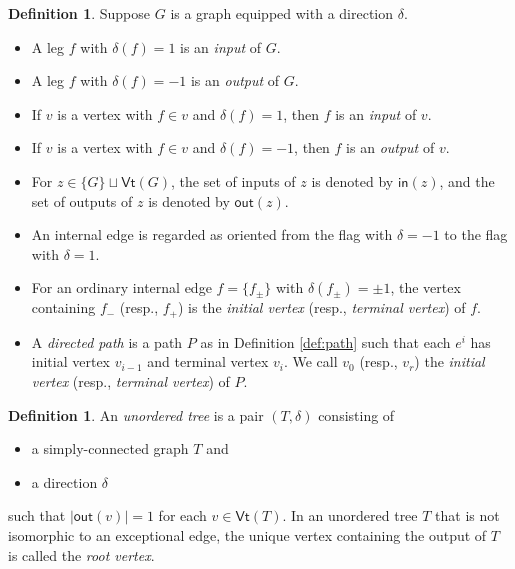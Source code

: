 \documentclass{amsbook}
\numberwithin{section}{chapter}
\numberwithin{subsection}{section}
\numberwithin{equation}{section}
\theoremstyle{plain}
\theoremstyle{definition}
\newtheorem{definition}[equation]{Definition}
\newcommand{\Vt}{\mathsf{Vt}}
\newcommand{\inp}{\mathsf{in}}
\newcommand{\out}{\mathsf{out}}
\begin{document}
\begin{definition}\label{def:directed-path} 
Suppose $G$ is a graph equipped with a direction $\delta$.
\begin{itemize} \item A leg $f$ with $\delta(f) = 1$ is an \emph{input} of $G$.
\item A leg $f$ with $\delta(f) = -1$ is an  \emph{output} of $G$.
\item If $v$ is a vertex with $f \in v$ and $\delta(f) = 1$, then $f$ is an \emph{input} of $v$.
\item If $v$ is a vertex with $f \in v$ and $\delta(f) = -1$, then $f$ is an \emph{output} of $v$.
\item For $z \in \{G\} \sqcup \Vt(G)$, the set of inputs of $z$ is denoted by $\inp(z)$, and the set of outputs of $z$ is denoted by $\out(z)$.
\item An internal edge is regarded as oriented from the flag with $\delta=-1$ to the flag with $\delta=1$.
\item For an ordinary internal edge $f=\{f_{\pm}\}$ with $\delta(f_{\pm})=\pm 1$, the vertex containing $f_-$ (resp., $f_+$) is the \emph{initial vertex} (resp., \emph{terminal vertex}) of $f$.
\item A \emph{directed path} is a path $P$ as in Definition \ref{def:path} such that each $e^i$ has initial vertex $v_{i-1}$ and terminal vertex $v_i$.  We call $v_0$ (resp., $v_r$) the \emph{initial vertex} (resp., \emph{terminal vertex}) of $P$.
\end{itemize}\end{definition}

\begin{definition}\label{def:unordered-tree}
An \emph{unordered tree} is a pair $(T,\delta)$ consisting of
\begin{itemize}\item a simply-connected graph $T$ and 
\item a direction $\delta$ 
\end{itemize}
such that $|\out(v)|=1$ for each $v \in \Vt(T)$.  In an unordered tree $T$ that is not isomorphic to an exceptional edge, the unique vertex containing the output of $T$ is called the \emph{root vertex}.
\end{definition}
\end{document}

